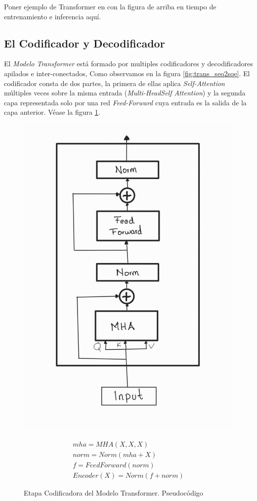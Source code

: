 Poner ejemplo de Transformer en con la figura de arriba en tiempo de entrenamiento e inferencia aquí.

\subsection{El Codificador y Decodificador}

El \textit{Modelo Transformer} está formado por multiples codificadores  y decodificadores apilados e inter-conectados,
Como observamos en la figura \ref{fig:trans_seq2sqe}. El codificador consta de dos partes,
la primera de ellas aplica \textit{Self-Attention} múltiples veces sobre la misma entrada
(\textit{Multi-HeadSelf Attention}) y la segunda capa representada solo por una red
\textit{Feed-Forward} cuya entrada es la salida de la capa anterior.
Véase la figura \ref{fig:trans_encoder}.


\begin{figure}[ht!]
\centering
    \begin{minipage}{.4\textwidth}
        \centering
        \includegraphics[width=0.7 \textwidth]{Chapters/1. Transformer/Figures/transformer/encoder.jpg}
    \end{minipage}
    \begin{minipage}{.5\textwidth}
        \begin{equation*}
            \begin{split}
                mha = MHA(X, X, X)\\
                norm = Norm( mha + X)\\
                f = FeedForward(norm)\\
                Encoder(X) = Norm(f + norm)
            \end{split}
            \label{eq:trans_enc}
        \end{equation*}
    \end{minipage}
    \caption{Etapa Codificadora del Modelo Transformer. Pseudocódigo}
    \label{fig:trans_encoder}
\end{figure}


